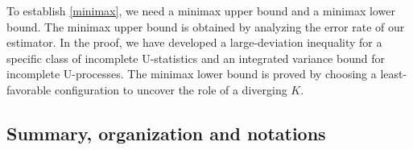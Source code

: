 \documentclass[preprint,11pt]{article}
\numberwithin{equation}{section}
\begin{document}
To establish \eqref{minimax}, we need a minimax upper bound and a minimax lower bound. 
The minimax upper bound is obtained by analyzing the error rate of our estimator. In the proof, we have developed a large-deviation inequality for a specific class of incomplete U-statistics and an integrated variance bound for incomplete U-processes. The minimax lower bound is proved by choosing a least-favorable configuration to uncover the role of a diverging $K$. 



  

%
%

\subsection{Summary, organization and notations}
\end{document}
